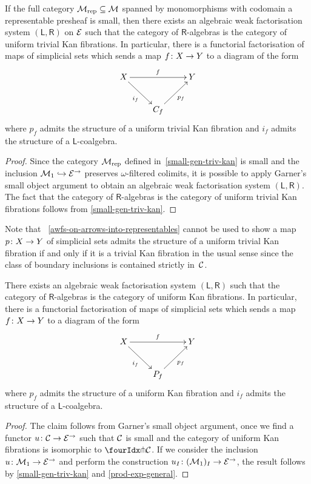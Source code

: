 \documentclass[reqno,10pt,a4paper,oneside]{amsart}
\begin{document}
\begin{corollary} If the full category $\cal{M}_{\textup{rep}} \subseteq \cal{M}$  spanned by 
 monomorphisms with codomain a representable
presheaf is small, then there exists an algebraic weak factorisation system $(\mathsf{L}, \mathsf{R})$ on
$\cal{E}$ such that the category of $\mathsf{R}$-algebras is the category of uniform trivial Kan fibrations. 
In particular, there is a functorial factorisation of maps of simplicial sets which sends
a map $f \co X \to Y$ to a diagram of the form
\[
\xymatrix{ 
X \ar[rr]^f \ar[dr]_{i_f}  & & Y \\
 & C_f \ar[ur]_{p_f} }
 \]
 where $p_f$ admits the structure of  a uniform trivial Kan fibration and 
 $i_f$ admits the structure of a $\mathsf{L}$-coalgebra.
\end{corollary}

\begin{proof} Since the category $\cal{M}_{\textup{rep}}$ defined in~\cref{small-gen-triv-kan} is small and
the inclusion $\cal{M}_1 \hookrightarrow \catE^\to$ preserves $\omega$-filtered colimits, 
it is possible to apply Garner's small object argument to
obtain an algebraic weak factorisation system $(\mathsf{L}, \mathsf{R})$.
The fact that the category of $\mathsf{R}$-algebras is the category of uniform trivial Kan fibrations
 follows from \cref{small-gen-triv-kan}.
 \end{proof} 

Note that ~\cref{awfs-on-arrows-into-representables} cannot be used to show 
a map $p \co X \to Y$ of simplicial sets admits the structure of a uniform trivial Kan fibration if and only if it is a trivial Kan fibration in the usual sense since  the class of boundary inclusions  is contained strictly  in~$\cal{C}$. 

\begin{corollary} There exists an algebraic weak factorisation system $(\mathsf{L}, \mathsf{R})$
such that the category of $\mathsf{R}$-algebras is the category of uniform Kan fibrations. 
In particular, there is a functorial factorisation of maps of simplicial sets which sends
a map $f \co X \to Y$ to a diagram of the form
\[
\xymatrix{ 
X \ar[rr]^f \ar[dr]_{i_f}  & & Y \\
 & P_f \ar[ur]_{p_f} }
 \]
 where $p_f$ admits the structure of  a uniform Kan fibration and 
 $i_f$ admits the structure of a $\mathsf{L}$-coalgebra.
\end{corollary} 

\begin{proof} The claim follows from Garner's small object argument, once we find a 
functor $u \co \cal{C} \rightarrow \catE^\to$ such that $\cal{C}$ is small and the
category of uniform Kan fibrations is isomorphic to $\liftr{\cal{C}}$. If we consider
the inclusion $u \co \mathcal{M}_1 \to \cal{E}^\to$ and perform the construction
$u_\interval \co (\mathcal{M}_1)_\interval \to \catE^\to$, the result follows 
by \cref{small-gen-triv-kan} and \cref{prod-exp-general}. 
\end{proof}
\end{document}
